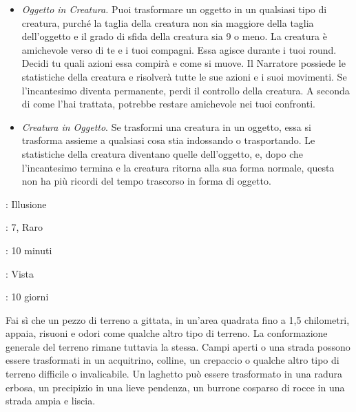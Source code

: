 \begin{multicols}{2}
\begin{itemize}[leftmargin=*]
	\item \emph{Oggetto in Creatura.} Puoi trasformare un oggetto in un qualsiasi tipo di creatura, purché la taglia della creatura non sia maggiore della taglia dell'oggetto e il grado di sfida della creatura sia 9 o meno. La creatura è amichevole verso di te e i tuoi compagni. Essa agisce durante i tuoi round. Decidi tu quali azioni essa compirà e come si muove. Il Narratore possiede le statistiche della creatura e risolverà tutte le sue azioni e i suoi movimenti.
	Se l'incantesimo diventa permanente, perdi il controllo della creatura. A seconda di come l'hai trattata, potrebbe restare amichevole nei tuoi confronti.

	\item \emph{Creatura in Oggetto}. Se trasformi una creatura in un oggetto, essa si trasforma assieme a qualsiasi cosa stia indossando o trasportando. Le statistiche della creatura diventano quelle dell'oggetto, e, dopo che l'incantesimo termina e la creatura ritorna alla sua forma normale, questa non ha più ricordi del tempo trascorso in forma di oggetto.

\end{itemize}

\noindent\colorbox{OBSSgold!10}{
\begin{minipage}{0.95\linewidth}
\begin{description}[noitemsep, topsep=0pt, parsep=0pt, partopsep=0pt, leftmargin=0cm, labelwidth=1.3cm]
	\item[\textbf{Lista}]: Illusione
	\item[\textbf{Livello}]: 7, Raro
	\item[\textbf{Lancio}]: 10 minuti
	\item[\textbf{Gittata}]: Vista
	\item[\textbf{Durata}]: 10 giorni
\end{description}
\end{minipage}}\smallskip

Fai sì che un pezzo di terreno a gittata, in un'area quadrata fino a 1,5 chilometri, appaia, risuoni e odori come qualche altro tipo di terreno. La conformazione generale del terreno rimane tuttavia la stessa. Campi aperti o una strada possono essere trasformati in un acquitrino, colline, un crepaccio o qualche altro tipo di terreno difficile o invalicabile. Un laghetto può essere trasformato in una radura erbosa, un precipizio in una lieve pendenza, un burrone cosparso di rocce in una strada ampia e liscia.


\end{multicols}
